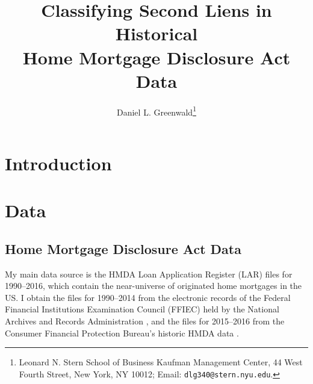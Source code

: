 \documentclass[letterpaper,12pt,usenames,dvipsnames]{article}
\newcommand{\todo}[1]{\ifcomments{\color{red} [#1]}\fi}
\theoremstyle{definition}
\begin{document}

\def\drop{/home/dan/Dropbox}

\newenvironment{tablenotes}{\begin{spacing}{1.0} \footnotesize \emph{Note:} }{\end{spacing}}
\newenvironment{figurenotes}{\begin{spacing}{1.0} \footnotesize \emph{Note:} }{\end{spacing}}

\title{Classifying Second Liens in Historical \\ Home Mortgage Disclosure Act Data} 
\author{Daniel L. Greenwald\thanks{Leonard N. Stern School of Business
		Kaufman Management Center, 44 West Fourth Street, New York, NY 10012; Email: \texttt{dlg340@stern.nyu.edu}.}
	}
\date{}

\maketitle

\begin{abstract}
\noindent \todo{TBC}
\end{abstract}

  
\section{Introduction}

\section{Data}\label{sec:data}


\subsection{Home Mortgage Disclosure Act Data}\label{sec:hmda-data}

My main data source is the HMDA Loan Application Register (LAR) files for 1990--2016, which contain the near-universe of originated home mortgages in the US. I obtain the files for 1990--2014 from the electronic records of the Federal Financial Institutions Examination Council (FFIEC) held by the National Archives and Records Administration \citep{nara2026hmda}, and the files for 2015--2016 from the Consumer Financial Protection Bureau's historic HMDA data \citep{cfpb2026hmda}. 
\end{document}

